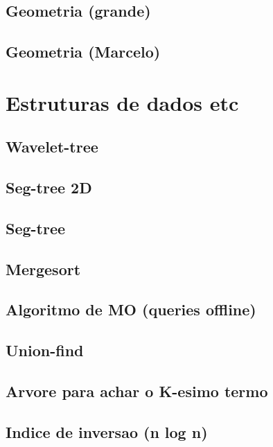 \subsection{Geometria (grande)}
\raggedbottom
\hrulefill
\subsection{Geometria (Marcelo)}
\raggedbottom
\hrulefill
\clearpage
\section{Estruturas de dados etc}
\subsection{Wavelet-tree}
\raggedbottom
\hrulefill
\subsection{Seg-tree 2D}
\raggedbottom
\hrulefill
\subsection{Seg-tree}
\raggedbottom
\hrulefill
\subsection{Mergesort}
\raggedbottom
\hrulefill
\subsection{Algoritmo de MO (queries offline)}
\raggedbottom
\hrulefill
\subsection{Union-find}
\raggedbottom
\hrulefill
\subsection{Arvore para achar o K-esimo termo}
\raggedbottom
\hrulefill
\subsection{Indice de inversao (n log n)}
\raggedbottom
\hrulefill
\clearpage
